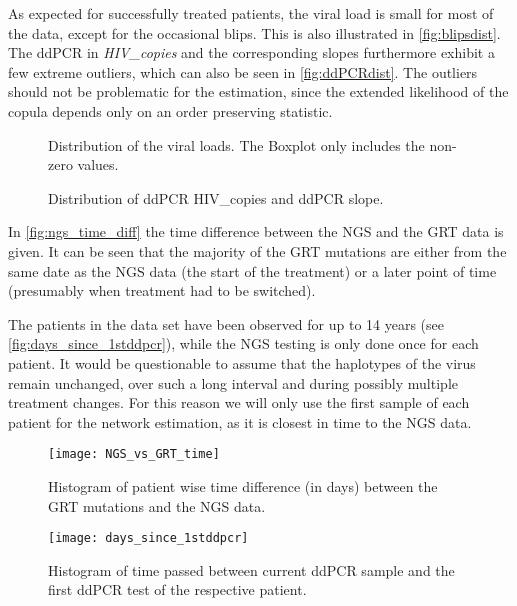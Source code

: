 As expected for successfully treated patients, the viral load is small for most of the data, except for the occasional blips.
This is also illustrated in \autoref{fig:blipsdist}.
The ddPCR in \textit{HIV\_copies} and the corresponding slopes furthermore exhibit a few extreme outliers,
which can also be seen in \autoref{fig:ddPCRdist}.
The outliers should not be problematic for the estimation, since the extended likelihood of the copula depends only on an order preserving statistic.
\begin{figure}[h]
	\centering
	\caption{Distribution of the viral loads. The Boxplot only includes the non-zero values.}
	
	\label{fig:blipsdist}
\end{figure}
\begin{figure}[h]
	\centering
	\caption{Distribution of ddPCR HIV\_copies and ddPCR slope.}
	
	\label{fig:ddPCRdist}
\end{figure}
In \autoref{fig:ngs_time_diff} the time difference between the NGS and the GRT data is given.
It can be seen that the majority of the GRT mutations are either from the same date as the NGS data (the start of the treatment) or a later point of time (presumably when treatment had to be switched).

The patients in the data set have been observed for up to 14 years (see \autoref{fig:days_since_1stddpcr}), while 
the NGS testing is only done once for each patient.
It would be questionable to assume that the haplotypes of the virus remain unchanged,
over such a long interval and during possibly multiple treatment changes.
For this reason we will only use the first sample of each patient for the network estimation,
as it is closest in time to the NGS data.
\begin{figure}
	\centering
	\texttt{[image: NGS\_vs\_GRT\_time]}
	\caption{Histogram of patient wise time difference (in days) between the GRT mutations and the NGS data.}
	\label{fig:ngs_time_diff}
\end{figure}
\begin{figure}
	\centering
	\texttt{[image: days\_since\_1stddpcr]}
	\caption{Histogram of time passed between current ddPCR sample and the first ddPCR test of the respective patient.}
	\label{fig:days_since_1stddpcr}
\end{figure}
\FloatBarrier
\ \ \\
\pagebreak
